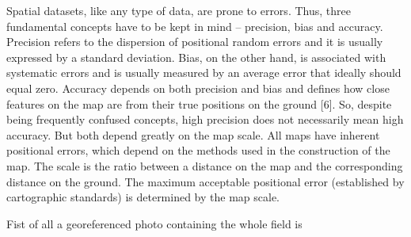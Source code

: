 Spatial datasets, like any type of data, are prone to errors. Thus, three fundamental concepts have to be kept in mind – precision, bias and accuracy. Precision refers to the dispersion of positional random errors and it is usually expressed by a standard deviation. Bias, on the other hand, is associated with systematic errors and is usually measured by an average error that ideally should equal zero. Accuracy depends on both precision and bias and defines how close features on the map are from their true positions on the ground [6]. So, despite being frequently confused concepts, high precision does not necessarily mean high accuracy. But both depend greatly on the map scale. All maps have inherent positional errors, which depend on the methods used in the construction of the map. The scale is the ratio between a distance on the map and the corresponding distance on the ground. The maximum acceptable positional error (established by cartographic standards) is determined by the map scale.

Fist of all a georeferenced photo containing the whole field is 

